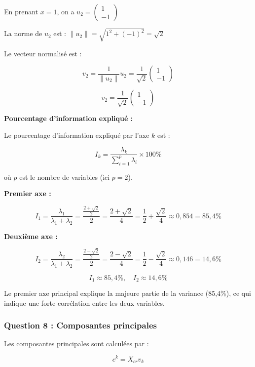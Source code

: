 \documentclass[11pt,a4paper]{article}
\begin{document}
En prenant $x = 1$, on a $u_2 = \begin{pmatrix} 1 \\ -1 \end{pmatrix}$

La norme de $u_2$ est : $\|u_2\| = \sqrt{1^2 + (-1)^2} = \sqrt{2}$

Le vecteur normalisé est :

$$v_2 = \frac{1}{\|u_2\|} u_2 = \frac{1}{\sqrt{2}} \begin{pmatrix} 1 \\ -1 \end{pmatrix}$$

$$\boxed{v_2 = \frac{1}{\sqrt{2}} \begin{pmatrix} 1 \\ -1 \end{pmatrix}}$$

\textbf{Pourcentage d'information expliqué :}

Le pourcentage d'information expliqué par l'axe $k$ est :

$$I_k = \frac{\lambda_k}{\sum_{i=1}^{p} \lambda_i} \times 100\%$$

où $p$ est le nombre de variables (ici $p = 2$).

\textbf{Premier axe :}

$$I_1 = \frac{\lambda_1}{\lambda_1 + \lambda_2} = \frac{\frac{2 + \sqrt{2}}{2}}{2} = \frac{2 + \sqrt{2}}{4} = \frac{1}{2} + \frac{\sqrt{2}}{4} \approx 0,854 = 85,4\%$$

\textbf{Deuxième axe :}

$$I_2 = \frac{\lambda_2}{\lambda_1 + \lambda_2} = \frac{\frac{2 - \sqrt{2}}{2}}{2} = \frac{2 - \sqrt{2}}{4} = \frac{1}{2} - \frac{\sqrt{2}}{4} \approx 0,146 = 14,6\%$$

$$\boxed{I_1 \approx 85,4\%, \quad I_2 \approx 14,6\%}$$

\begin{astucebox}
Le premier axe principal explique la majeure partie de la variance (85,4\%), ce qui indique une forte corrélation entre les deux variables.
\end{astucebox}

\subsubsection{Question 8 : Composantes principales}

Les composantes principales sont calculées par :

$$c^k = X_{cr} v_k$$
\end{document}
